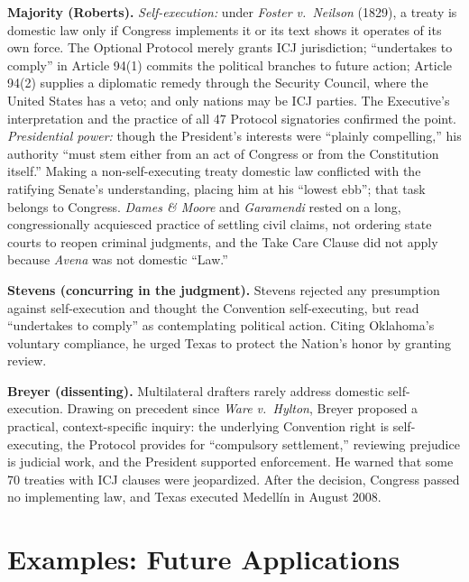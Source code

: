 \documentclass[12pt]{article}
\begin{document}
\textbf{Majority (Roberts).} \emph{Self-execution:} under \textit{Foster v.\ Neilson} (1829), a treaty is domestic law only if Congress implements it or its text shows it operates of its own force. The Optional Protocol merely grants ICJ jurisdiction; ``undertakes to comply'' in Article 94(1) commits the political branches to future action; Article 94(2) supplies a diplomatic remedy through the Security Council, where the United States has a veto; and only nations may be ICJ parties. The Executive's interpretation and the practice of all 47 Protocol signatories confirmed the point. \emph{Presidential power:} though the President's interests were ``plainly compelling,'' his authority ``must stem either from an act of Congress or from the Constitution itself.'' Making a non-self-executing treaty domestic law conflicted with the ratifying Senate's understanding, placing him at his ``lowest ebb''; that task belongs to Congress. \textit{Dames \& Moore} and \textit{Garamendi} rested on a long, congressionally acquiesced practice of settling civil claims, not ordering state courts to reopen criminal judgments, and the Take Care Clause did not apply because \textit{Avena} was not domestic ``Law.''

\textbf{Stevens (concurring in the judgment).} Stevens rejected any presumption against self-execution and thought the Convention self-executing, but read ``undertakes to comply'' as contemplating political action. Citing Oklahoma's voluntary compliance, he urged Texas to protect the Nation's honor by granting review.

\textbf{Breyer (dissenting).} Multilateral drafters rarely address domestic self-execution. Drawing on precedent since \textit{Ware v.\ Hylton}, Breyer proposed a practical, context-specific inquiry: the underlying Convention right is self-executing, the Protocol provides for ``compulsory settlement,'' reviewing prejudice is judicial work, and the President supported enforcement. He warned that some 70 treaties with ICJ clauses were jeopardized. After the decision, Congress passed no implementing law, and Texas executed Medell\'{i}n in August 2008.

\section{Examples: Future Applications}
\end{document}
